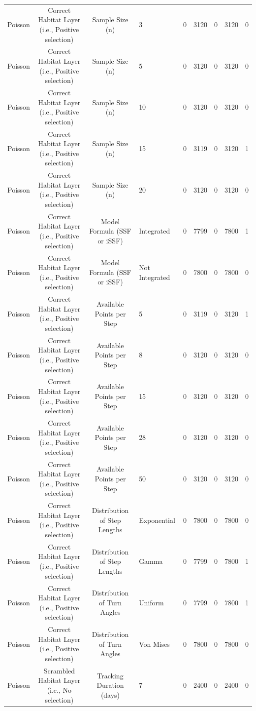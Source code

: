 \documentclass[10pt,a4paper]{article}
\begin{document}
\begin{table}
{\begin{tabular}[t]{lcclcclcc}
Poisson & Correct Habitat Layer (i.e., Positive selection) & Sample Size (n) & 3 & 0 & 3120 & 0 & 3120 & 0\\
Poisson & Correct Habitat Layer (i.e., Positive selection) & Sample Size (n) & 5 & 0 & 3120 & 0 & 3120 & 0\\
Poisson & Correct Habitat Layer (i.e., Positive selection) & Sample Size (n) & 10 & 0 & 3120 & 0 & 3120 & 0\\
Poisson & Correct Habitat Layer (i.e., Positive selection) & Sample Size (n) & 15 & 0 & 3119 & 0 & 3120 & 1\\
Poisson & Correct Habitat Layer (i.e., Positive selection) & Sample Size (n) & 20 & 0 & 3120 & 0 & 3120 & 0\\
Poisson & Correct Habitat Layer (i.e., Positive selection) & Model Formula (SSF or iSSF) & Integrated & 0 & 7799 & 0 & 7800 & 1\\
Poisson & Correct Habitat Layer (i.e., Positive selection) & Model Formula (SSF or iSSF) & Not Integrated & 0 & 7800 & 0 & 7800 & 0\\
Poisson & Correct Habitat Layer (i.e., Positive selection) & Available Points per Step & 5 & 0 & 3119 & 0 & 3120 & 1\\
Poisson & Correct Habitat Layer (i.e., Positive selection) & Available Points per Step & 8 & 0 & 3120 & 0 & 3120 & 0\\
Poisson & Correct Habitat Layer (i.e., Positive selection) & Available Points per Step & 15 & 0 & 3120 & 0 & 3120 & 0\\
Poisson & Correct Habitat Layer (i.e., Positive selection) & Available Points per Step & 28 & 0 & 3120 & 0 & 3120 & 0\\
Poisson & Correct Habitat Layer (i.e., Positive selection) & Available Points per Step & 50 & 0 & 3120 & 0 & 3120 & 0\\
Poisson & Correct Habitat Layer (i.e., Positive selection) & Distribution of Step Lengths & Exponential & 0 & 7800 & 0 & 7800 & 0\\
Poisson & Correct Habitat Layer (i.e., Positive selection) & Distribution of Step Lengths & Gamma & 0 & 7799 & 0 & 7800 & 1\\
Poisson & Correct Habitat Layer (i.e., Positive selection) & Distribution of Turn Angles & Uniform & 0 & 7799 & 0 & 7800 & 1\\
Poisson & Correct Habitat Layer (i.e., Positive selection) & Distribution of Turn Angles & Von Mises & 0 & 7800 & 0 & 7800 & 0\\
Poisson & Scrambled Habitat Layer (i.e., No selection) & Tracking Duration (days) & 7 & 0 & 2400 & 0 & 2400 & 0\\

\end{tabular}}
\end{table}
\end{document}
